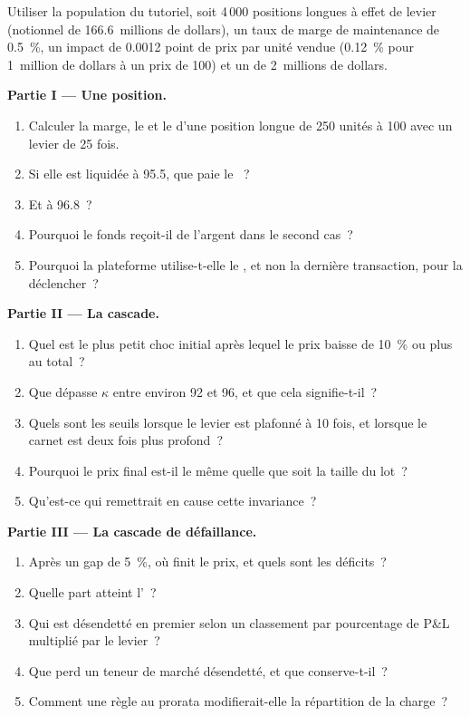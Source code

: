 \begin{problem}\label{pb:m3:margin-liquidation-and-loss-allocation:1}
Utiliser la population du tutoriel, soit 4\,000 positions longues à effet de levier (notionnel de 166.6~millions de dollars), un taux de marge de maintenance de 0.5~\%,
un impact de 0.0012 point de prix par unité vendue (0.12~\% pour 1~million de dollars à un prix de 100) et un 
de 2~millions de dollars.

\medskip\noindent\textbf{Partie I --- Une position.}
\begin{enumerate}
\item Calculer la marge, le  et le  d'une position longue de 250 unités à 100 avec un levier de 25 fois.
\item Si elle est liquidée à 95.5, que paie le ~?
\item Et à 96.8~?
\item Pourquoi le fonds reçoit-il de l'argent dans le second cas~?
\item Pourquoi la plateforme utilise-t-elle le , et non la dernière transaction, pour la déclencher~?
\end{enumerate}

\medskip\noindent\textbf{Partie II --- La cascade.}
\begin{enumerate}[resume]
\item Quel est le plus petit choc initial après lequel le prix baisse de 10~\% ou plus au total~?
\item Que dépasse $\kappa$ entre environ 92 et 96, et que cela signifie-t-il~?
\item Quels sont les seuils lorsque le levier est plafonné à 10 fois, et lorsque le carnet est deux fois plus profond~?
\item Pourquoi le prix final est-il le même quelle que soit la taille du lot~?
\item Qu'est-ce qui remettrait en cause cette invariance~?
\end{enumerate}

\medskip\noindent\textbf{Partie III --- La cascade de défaillance.}
\begin{enumerate}[resume]
\item Après un gap de 5~\%, où finit le prix, et quels sont les déficits~?
\item Quelle part atteint l'~?
\item Qui est désendetté en premier selon un classement par pourcentage de P\&L multiplié par le levier~?
\item Que perd un teneur de marché désendetté, et que conserve-t-il~?
\item Comment une règle au prorata modifierait-elle la répartition de la charge~?
\end{enumerate}


\end{problem}
